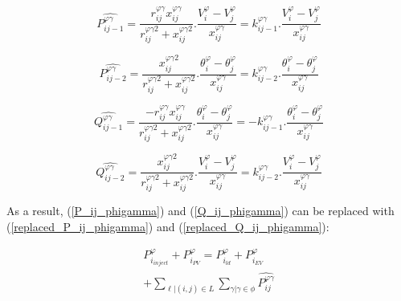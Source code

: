 \documentclass[journal]{IEEEtran}
\begin{document}
\begin{equation}\label{linearized_Pij1}
\hat{P _{ij-1} ^{\varphi\gamma} }=\frac {r_{ij}^{\varphi\gamma}x_{ij}^{\varphi\gamma}} {r_{ij}^{\varphi\gamma2}+ x_{ij}^{\varphi\gamma2}} . \frac {V _{i} ^{\varphi} - V _{j} ^{\varphi}} {x _{ij} ^{\varphi\gamma}} = k _{ij-1} ^{\varphi\gamma} . \frac {V _{i} ^{\varphi} - V _{j} ^{\varphi}} {x _{ij} ^{\varphi\gamma}}
\end{equation}

\begin{equation}\label{linearized_Pij2}
\hat{P _{ij-2} ^{\varphi\gamma}}=\frac {x_{ij}^{\varphi\gamma2}} {r_{ij}^{\varphi\gamma2}+ x_{ij}^{\varphi\gamma2}} . \frac {\theta _{i} ^{\varphi} - \theta _{j} ^{\varphi}} {x _{ij} ^{\varphi\gamma}} = k _{ij-2} ^{\varphi\gamma} . \frac {\theta _{i} ^{\varphi} - \theta _{j} ^{\varphi}} {x _{ij} ^{\varphi\gamma}}
\end{equation}

\begin{equation}\label{linearized_Qij1}
\hat{Q _{ij-1} ^{\varphi\gamma}}=\frac {-r_{ij}^{\varphi\gamma}x_{ij}^{\varphi\gamma}} {r_{ij}^{\varphi\gamma2}+ x_{ij}^{\varphi\gamma2}} . \frac {\theta _{i} ^{\varphi} - \theta _{j} ^{\varphi}} {x _{ij} ^{\varphi\gamma}} =- k _{ij-1} ^{\varphi\gamma} . \frac {\theta _{i} ^{\varphi} - \theta _{j} ^{\varphi}} {x _{ij} ^{\varphi\gamma}}
\end{equation}

\begin{equation}\label{linearized_Qij2}
\hat{Q _{ij-2} ^{\varphi\gamma}}=\frac {x_{ij}^{\varphi\gamma2}} {r_{ij}^{\varphi\gamma2}+ x_{ij}^{\varphi\gamma2}} . \frac {V _{i} ^{\varphi} - V _{j} ^{\varphi}} {x _{ij} ^{\varphi\gamma}} = k _{ij-2} ^{\varphi\gamma} . \frac {V _{i} ^{\varphi} - V _{j} ^{\varphi}} {x _{ij} ^{\varphi\gamma}}
\end{equation}

As a result, (\ref{P_ij_phigamma}) and (\ref{Q_ij_phigamma}) can be replaced with (\ref{replaced_P_ij_phigamma}) and (\ref{replaced_Q_ij_phigamma}):

\begin{center}
\begin{equation}\label{replaced_P_ij_phigamma}
\begin{split}
\textit{P}_{i_{inject}} ^{\varphi} + P _{i_{PV}} ^{\varphi} =  P _{i_{ld}} ^{\varphi} +  P _{i_{EV}} ^{\varphi} \\ +\displaystyle\sum_{\ell|(i,j)\in L}\displaystyle\sum_{\gamma|\gamma\in\phi}\hat{P_{ij}^{\varphi\gamma}}
\end{split}
\end{equation}
\end{center}
\end{document}
